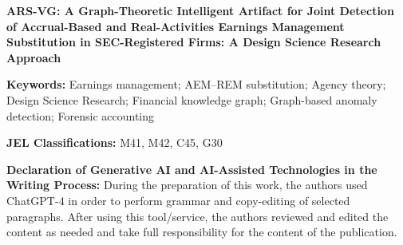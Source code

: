\documentclass[12pt]{article}
\begin{document}
\begin{center}
{\Large\textbf{ARS-VG: A Graph-Theoretic Intelligent Artifact for Joint
Detection of Accrual-Based and Real-Activities Earnings Management
Substitution in SEC-Registered Firms: A Design Science Research
Approach}}
\end{center}
\thispagestyle{empty}

\begin{abstract}
\noindent
Although substitution between accrual-based earnings management (AEM)
and real activities manipulation (REM) is well documented at the aggregate
level, existing tools analyze each channel in isolation, leaving firm-level
substitution unobservable.  We present \textbf{ARS-VG} (Accrual--Real
Substitution Vulnerability Graph), a Design Science Research artifact
modeling financial statements as directed graphs with $z$-score anomaly
detection and governance-constrained classification.  Evaluated on the
JarFraud benchmark (146{,}045 observations) against the Beneish M-Score,
Dechow F-Score, and \citet{bao2020}'s RUSBoost, the ensemble achieves the
highest recall (77.1 percent) at the Youden-optimal threshold, though
RUSBoost dominates at strict operating points; a feature-asymmetry
decomposition attributes most of this gap to richer feature access, not
algorithmic sophistication ($0.194$ AUC).  Scenario testing verifies correct
rule-execution across four calibrated regimes; population-scale evaluation
of the governance-moderated classifier fails under the panel's
covariate-sparse specification, generalizing to other threshold-gated
classifiers.  ARS-VG is positioned as a demonstrated proof-of-concept, not
an audit screen or population-validated detector.
\end{abstract}

\medskip
\noindent\textbf{Keywords:} Earnings management; AEM--REM substitution;
Agency theory; Design Science Research; Financial knowledge graph;
Graph-based anomaly detection; Forensic accounting

\medskip
\noindent\textbf{JEL Classifications:} M41, M42, C45, G30

\medskip
\noindent\textbf{Declaration of Generative AI and AI-Assisted Technologies in the Writing Process:}
During the preparation of this work, the authors used ChatGPT-4 in
order to perform grammar and copy-editing of selected paragraphs.
After using this tool/service, the authors reviewed and edited the
content as needed and take full responsibility for the content of
the publication.
\end{document}
